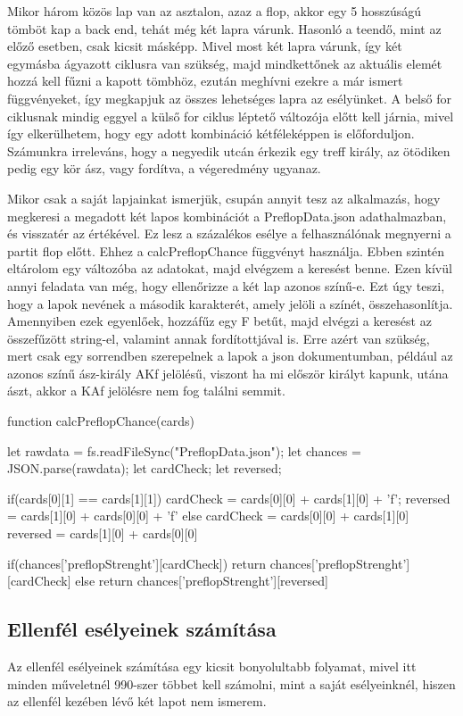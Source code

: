 Mikor három közös lap van az asztalon, azaz a flop, akkor egy 5 hosszúságú tömböt kap a back end, tehát még két lapra várunk.  Hasonló a teendő, mint az előző esetben, csak kicsit másképp. Mivel most két lapra várunk, így két egymásba ágyazott ciklusra van szükség, majd mindkettőnek az aktuális elemét hozzá kell fűzni a kapott tömbhöz, ezután meghívni ezekre a már ismert függvényeket, így megkapjuk az összes lehetséges lapra az esélyünket. A belső for ciklusnak mindig eggyel a külső for ciklus léptető változója előtt kell járnia, mivel így elkerülhetem, hogy egy adott kombináció kétféleképpen is előforduljon. Számunkra irreleváns, hogy a negyedik utcán érkezik egy treff király, az ötödiken pedig egy kör ász, vagy fordítva, a végeredmény ugyanaz.

Mikor csak a saját lapjainkat ismerjük, csupán annyit tesz az alkalmazás, hogy megkeresi a megadott két lapos kombinációt a PreflopData.json adathalmazban, és visszatér az értékével. Ez lesz a százalékos esélye a felhasználónak megnyerni a partit flop előtt. Ehhez a calcPreflopChance függvényt használja. Ebben szintén eltárolom egy változóba az adatokat, majd elvégzem a keresést benne. Ezen kívül annyi feladata van még, hogy ellenőrizze a két lap azonos színű-e. Ezt úgy teszi, hogy a lapok nevének a második karakterét, amely jelöli a színét, összehasonlítja. Amennyiben ezek egyenlőek, hozzáfűz egy F betűt, majd elvégzi a keresést az összefűzött string-el, valamint annak fordítottjával is. Erre azért van szükség, mert csak egy sorrendben szerepelnek a lapok a json dokumentumban, például az azonos színű ász-király AKf jelölésű, viszont ha mi először királyt kapunk, utána ászt, akkor a KAf jelölésre nem fog találni semmit.

\begin{python}
function calcPreflopChance(cards){
  let rawdata = fs.readFileSync("PreflopData.json");
  let chances = JSON.parse(rawdata);
  let cardCheck;
  let reversed;

  if(cards[0][1] == cards[1][1]){
    cardCheck = cards[0][0] + cards[1][0] + 'f';
    reversed = cards[1][0] + cards[0][0] + 'f'
  } else {
    cardCheck = cards[0][0] + cards[1][0]
    reversed = cards[1][0] + cards[0][0] 
  }

  if(chances['preflopStrenght'][cardCheck]){
    return chances['preflopStrenght'][cardCheck]
  } else {
    return chances['preflopStrenght'][reversed]
  }
}
\end{python}

\subsection{Ellenfél esélyeinek számítása}
Az ellenfél esélyeinek számítása egy kicsit bonyolultabb folyamat, mivel itt minden műveletnél 990-szer többet kell számolni, mint a saját esélyeinknél, hiszen az ellenfél kezében lévő két lapot nem ismerem.

